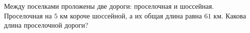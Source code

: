 \begin{ex}
	\begin{condition}
		Между поселками проложены две дороги: проселочная и шоссейная. Проселочная на \( 5 \) км короче шоссейной, а их общая длина равна \( 61 \) км. Какова длина проселочной дороги?
	\end{condition}
\end{ex}